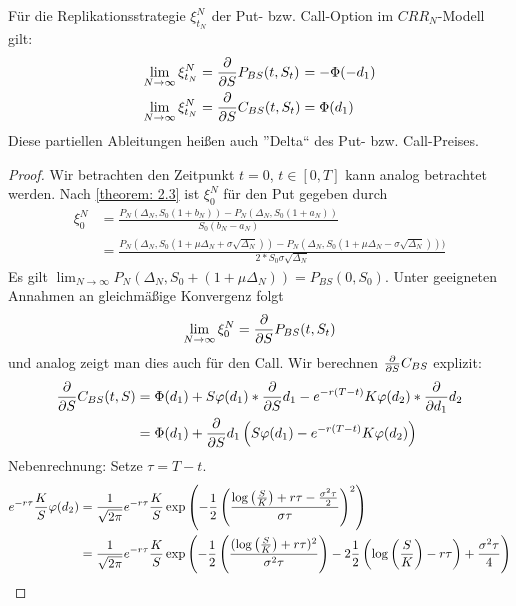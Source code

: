 \begin{theorem}
	Für die Replikationsstrategie $\xi_{t_N}^N$ der Put- bzw. Call-Option im $CRR_N$-Modell gilt:
	\begin{equation*}
		\begin{alignedat}{2}
			\lim_{N \to \infty} \xi_{t_N}^N &= \frac{\partial}{\partial S } P_{BS}(t,S_t) &&= -\Phi(-d_1) \\
			\lim_{N \to \infty} \xi_{t_N}^N &= \frac{\partial}{\partial S } C_{BS}(t,S_t) &&= \Phi(d_1)
		\end{alignedat}
	\end{equation*}
	Diese partiellen Ableitungen heißen auch ''Delta`` des Put- bzw. Call-Preises.
\end{theorem}
\begin{proof}
	Wir betrachten den Zeitpunkt $t = 0$, $t \in [0,T]$ kann analog betrachtet werden.
	Nach \cref{theorem: 2.3} ist $\xi_0^N$ für den Put gegeben durch
	\begin{equation*}
		\begin{aligned}
			\xi_0^N &= \frac{P_N(\Delta_N, S_0(1+b_N)) - P_N(\Delta_N, S_0 (1+a_N))}{S_0 (b_N - a_N)} \\
			&= \frac{P_N(\Delta_N, S_0(1 + \mu \Delta_N + \sigma \sqrt{\Delta_N})) - P_N (\Delta_N, S_0 (1+ \mu \Delta_N - \sigma \sqrt{\Delta_N})))}{2 * S_0 \sigma \sqrt{\Delta_N}}
		\end{aligned}
	\end{equation*}
	Es gilt $\lim_{N \to \infty} P_N(\Delta_N, S_0 + (1 + \mu \Delta_N)) = P_{BS}(0,S_0)$. Unter geeigneten Annahmen an gleichmäßige Konvergenz folgt 
	\begin{equation*}
		\lim_{N \to \infty} \xi_0^N = \frac{\partial}{\partial S } P_{BS} (t, S_t)
	\end{equation*}
	und analog zeigt man dies auch für den Call.
	Wir berechnen $\frac{\partial}{\partial S } C_{BS}$ explizit:
	\begin{align*}
		\frac{\partial}{\partial S } C_{BS}(t,S) &= \Phi(d_1) + S \varphi(d_1) * \frac{\partial}{\partial S } d_1 - e^{-r(T-t)} K \varphi(d_2) * \frac{\partial}{\partial d_1 } d_2 \\
		&= \Phi(d_1) + \frac{\partial}{\partial S } d_1 \left( S \varphi(d_1) - e^{-r(T-t)} K \varphi(d_2) \right)
	\end{align*}
	Nebenrechnung: Setze $\tau = T - t$.
	\begin{align*}
		e^{-r \tau} \frac{K}{S} \phi(d_2) &= \frac{1}{\sqrt{2\pi}} e^{-r \tau} \frac{K}{S} \exp \brackets{-\frac{1}{2} \brackets{\frac{\log\brackets{\frac{S}{K}} + r \tau - \frac{\sigma^2 \tau}{2}}{\sigma \tau}}^2} \\
		&= \frac{1}{\sqrt{2\pi}} e^{-r \tau} \frac{K}{S} \exp\brackets{-\frac{1}{2} \brackets{\frac{(\log\brackets{\frac{S}{K}} + r \tau)^2}{\sigma^2 \tau}} - 2 \frac{1}{2} \brackets{\log\brackets{\frac{S}{K}} - r \tau} + \frac{\sigma^2 \tau}{4}} \\

\end{align*}
\end{proof}
